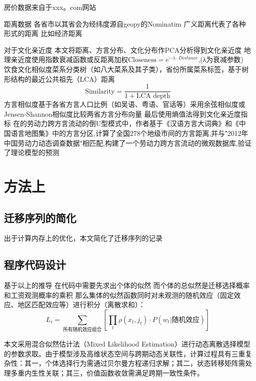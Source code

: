 \documentclass[a4paper,12pt,oneside]{book} %
\begin{document}
房价数据来自于xxx。com网站

距离数据
各省市以其省会为经纬度源自geopy的Nominatim
广义距离代表了各种形式的距离 比如经济距离

对于文化亲近度
本文将距离、方言分布、文化分布作PCA分析得到文化亲近度
地理亲近度使用指数衰减函数或反距离加权$\text{Closeness}=e^ {-\lambda \cdot Distance}$,(λ为衰减参数)
饮食文化相似度菜系分类树（如八大菜系及其子类），省份所属菜系标签，基于树形结构的最近公共祖先（LCA）距离
\begin{equation}
  \text{Similarity}=\frac{1}{1+\text{LCA depth}}
\end{equation}
方言相似度基于各省方言人口比例（如吴语、粤语、官话等）采用余弦相似度或Jensen-Shannon相似度比较两省方言分布向量
最后使用熵值法得到文化亲近度指标
在\cite{LiuYuYunLaoDongLiKuaFangYanLiuDongDeDaoUXingMoShi2015}的劳动力跨方言流动的倒U型模式中，作者基于《汉语方言大词典》和《中国语言地图集》中的方言分区,计算了全国278个地级市间的方言距离,并与"2012年中国劳动力动态调查数据"相匹配,构建了一个劳动力跨方言流动的微观数据库,验证了理论模型的预测





\section{方法上} %
\label{sub:方法上}


\subsection{迁移序列的简化}

出于计算内存上的优化，本文简化了迁移序列的记录

\subsection{程序代码设计}
基于以上的推导
在代码中需要先求出个体的似然
而个体的总似然是迁移选择概率和工资观测概率的乘积
那么集体的似然函数同时对未观测的随机效应（固定效应、地区匹配效应等）进行积分（离散求和）：
\begin{equation}
  L_{i}=\sum\limits_{\text{所有随机效应组合}}[\prod_{t}\rho(x_{t},j_{t})⋅P(w_{t}|\text{随机效应}) ]
\end{equation}

本文采用混合似然估计法（Mixed Likelihood Estimation）进行动态离散选择模型的参数求取。由于模型涉及高维状态空间与跨期动态关联性，计算过程具有三重复杂性：其一，个体选择行为需通过贝尔曼方程递归求解；其二，状态转移矩阵需处理多重内生性关联；其三，价值函数收敛需满足跨期一致性条件。
\end{document}
